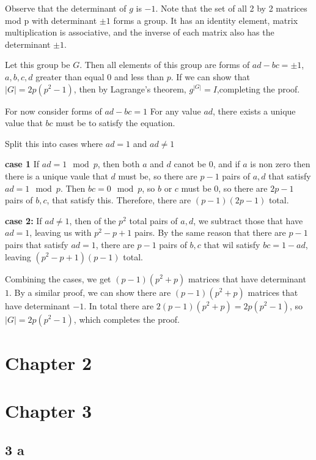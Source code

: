 \documentclass[11pt]{article}
\begin{document}
Observe that the determinant of \(g\)  is \(-1\). Note that the set of all 2 by 2 matrices
mod p
with determinant \(\pm 1\) forms a group. It has an identity element,
matrix multiplication is associative, and the inverse of each matrix
also has the determinant \(\pm 1\).

Let this group be \(G\).  Then all elements of this group are forms of \(ad - bc = \pm 1\),
\(a, b, c, d\) greater than equal \(0\) and  less than \(p\). If we can show that
\(|G| = 2p(p^2 - 1)\), then by Lagrange's theorem, \(g^{|G|} = I\),completing the proof.


For now consider forms of \(ad - bc = 1\)
For any value \(ad\), there exists a unique value that \(bc\) must be to
satisfy the equation.

Split this into cases where \(ad = 1\) and \(ad \ne 1\)

\textbf{case 1}
If \(ad = 1 \mod p\), then both \(a\) and \(d\) canot be \(0\), and if \(a\) is non zero
then there is a unique vaule that \(d\) must be, so there are \(p - 1\) pairs of \(a, d\)
that satisfy \(ad = 1 \mod p\).  Then \(bc = 0 \mod p\), so \(b\) or \(c\) must be \(0\), so
there are \(2p - 1\) pairs of \(b, c\), that satisfy this.  Therefore, there are
\((p - 1)(2p - 1)\) total.

\textbf{case 2:}
If \(ad \ne 1\), then of the \(p^2\) total pairs of \(a, d\), we subtract those that have
\(ad = 1\), leaving us with \(p^2 - p + 1\) pairs.  By the same reason that
there are \(p - 1\) pairs that satisfy \(ad = 1\), there are \(p -1\) pairs of \(b, c\)
that wil satisfy \(bc = 1 - ad\), leaving \((p^2 - p + 1)(p - 1)\) total.

Combining the cases, we get \((p - 1)(p^2 + p)\) matrices that have determinant \(1\).
By a similar proof, we can show there are \((p - 1)(p^2 + p)\) matrices that have
determinant \(-1\).  In total there are \(2(p-1)(p^2 + p) = 2p(p^2 - 1)\), so
\(|G| = 2p(p^2 - 1)\), which completes the proof.
\section{Chapter 2}
\label{sec:orga1e6458}
\section{Chapter 3}
\label{sec:orgf97c46e}
\subsection{3 a}
\label{sec:orgbdaf829}
\end{document}

